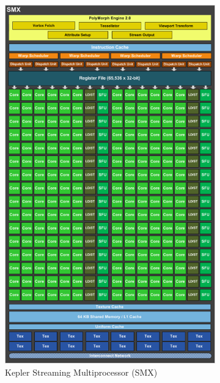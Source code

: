 \documentclass[american, hauptseminar, twoside]{zihpub}
\begin{document}
			\begin{figure}[h]		
				\centering
				\begin{subfigure}[b]{0.48\textwidth}
					\includegraphics[width=\textwidth]{grafiken/kepler}
					\caption{Kepler Streaming Multiprocessor (SMX)}
				\end{subfigure}
				\begin{subfigure}[b]{0.4347\textwidth}

\end{subfigure}
\end{figure}
\end{document}
